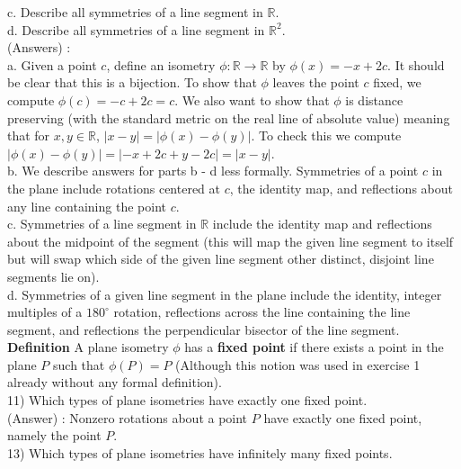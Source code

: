 \documentclass[12pt, letterpaper]{article}
\begin{document}
c. Describe all symmetries of a line segment in $\mathbb{R}$. \\

d. Describe all symmetries of a line segment in $\mathbb{R}^2$. \\

(Answers) : \\

a. Given a point $c$, define an isometry $\phi : \mathbb{R} \rightarrow \mathbb{R}$ by $\phi(x) = -x + 2c$. It should be clear that this is a bijection. To show that $\phi$ leaves the point $c$ fixed, we compute $\phi(c) = -c + 2c = c$. We also want to show that $\phi$ is distance preserving (with the standard metric on the real line of absolute value) meaning that for $x,y \in \mathbb{R}$, $|x-y| = |\phi(x) - \phi(y)|$. To check this we compute $|\phi(x) - \phi(y)| = |-x+2c +y - 2c| = |x-y|$. \\

b. We describe answers for parts b - d less formally. Symmetries of a point $c$ in the plane include rotations centered at $c$, the identity map, and reflections about any line containing the point $c$. \\

c. Symmetries of a line segment in $\mathbb{R}$ include the identity map and reflections about the midpoint of the segment (this will map the given line segment to itself but will swap which side of the given line segment other distinct, disjoint line segments lie on). \\

d. Symmetries of a given line segment in the plane include the identity, integer multiples of a $180^{\circ}$ rotation, reflections across the line containing the line segment, and reflections the perpendicular bisector of the line segment. \\ 

{\bf Definition} A plane isometry $\phi$ has a {\bf fixed point} if there exists a point in the plane $P$ such that $\phi(P) =P$ (Although this notion was used in exercise 1 already without any formal definition). \\

11) Which types of plane isometries have exactly one fixed point. \\

(Answer) : Nonzero rotations about a point $P$ have exactly one fixed point, namely the point $P$. \\

13) Which types of plane isometries have infinitely many fixed points. \\
\end{document}
